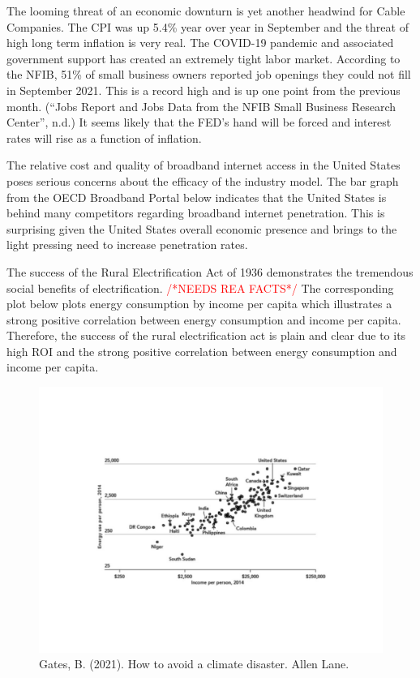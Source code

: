 \documentclass[a4paper,oneside]{article}
\newcommand\myworries[1]{\textcolor{red}{#1}}
\begin{document}
	The looming threat of an economic downturn is yet another headwind for Cable
	Companies. The CPI was up 5.4\% year over year in September and the threat of high long term
	inflation is very real. The COVID-19 pandemic and associated government support has created
	an extremely tight labor market. According to the NFIB, 51\% of small business owners reported
	job openings they could not fill in September 2021. This is a record high and is up one point
	from the previous month. (“Jobs Report and Jobs Data from the NFIB Small Business Research
	Center”, n.d.) It seems likely that the FED's hand will be forced and interest rates will rise as a
	function of inflation.

	The relative cost and quality of broadband internet access in the United States poses
	serious concerns about the efficacy of the industry model. The bar graph from the OECD
	Broadband Portal below indicates that the United States is behind many competitors regarding
	broadband internet penetration. This is surprising given the United States overall economic
	presence and brings to the light pressing need to increase penetration rates.

	The success of the Rural Electrification Act of 1936 demonstrates the tremendous social benefits of electrification. 
	\myworries{/*NEEDS REA FACTS*/}
	The corresponding plot below plots energy consumption by income per capita which illustrates a strong positive correlation between energy consumption and income per capita. 
	Therefore, the success of the rural electrification act is plain and clear due to its high ROI and the strong positive correlation between energy consumption and income per capita. 
	\begin{figure}
		\includegraphics[width=\columnwidth]{img/GATES}
		\caption{Gates, B. (2021). How to avoid a climate disaster. Allen Lane.}
	\end{figure}
\end{document}
